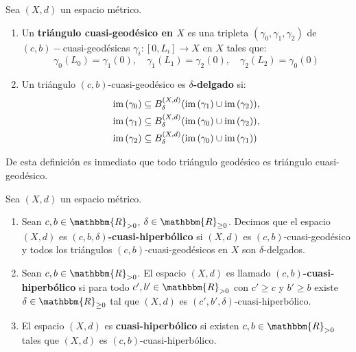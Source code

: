 \documentclass[12pt]{report}
\theoremstyle{largebreak}
\newcommand\cf[3]{\ensuremath{#1:#2\rightarrow#3}}
\newcommand{\bbm}[1]{\ensuremath{\mathbbm{#1}}}
\newcommand{\im}[1]{\ensuremath{\textup{im}\left(#1\right)}}
\begin{document}
    \begin{mydef}
        Sea $(X,d)$ un espacio métrico.
        \begin{enumerate}[label = \textit{\arabic*}]
            \item Un \textbf{triángulo cuasi-geodésico en $X$} es una tripleta $(\gamma_0,\gamma_1,\gamma_2)$ de $(c,b)-$cuasi-geodésicas $\cf{\gamma_i}{[0,L_i]}{X}$ en $X$ tales que:
            \begin{equation*}
                \gamma_0(L_0)=\gamma_1(0),\quad \gamma_1(L_1)=\gamma_2(0),\quad \gamma_2(L_2)=\gamma_0(0)
            \end{equation*}
            \item Un triángulo $(c,b)$-cuasi-geodésico es \textbf{$\delta$-delgado} si:
            \begin{equation*}
                \begin{split}
                    \im{\gamma_0}&\subseteq B_{\delta}^{(X,d)}(\im{\gamma_1}\cup\im{\gamma_2}),\\
                    \im{\gamma_1}&\subseteq B_{\delta}^{(X,d)}(\im{\gamma_0}\cup\im{\gamma_2}),\\
                    \im{\gamma_2}&\subseteq B_{\delta}^{(X,d)}(\im{\gamma_0}\cup\im{\gamma_1})\\
                \end{split}
            \end{equation*}
        \end{enumerate}
    \end{mydef}


    \begin{obs}
        De esta definición es inmediato que todo triángulo geodésico es triángulo cuasi-geodésico.
    \end{obs}

    \begin{mydef}
        Sea $(X,d)$ un espacio métrico.
        \begin{enumerate}[label = \textit{(\arabic*)}]
            \item Sean $c,b\in\bbm{R}_{>0}$, $\delta\in\bbm{R}_{\geq0}$. Decimos que el espacio $(X,d)$ es \textbf{$(c,b,\delta)$-cuasi-hiperbólico} si $(X,d)$ es $(c,b)$-cuasi-geodésico y todos los triángulos $(c,b)$-cuasi-geodésicos en $X$ son $\delta$-delgados.
            \item Sean $c,b\in\bbm{R}_{>0}$. El espacio $(X,d)$ es llamado \textbf{$(c,b)$-cuasi-hiperbólico} si para todo $c',b'\in\bbm{R}_{>0}$ con $c'\geq c$ y $b'\geq b$ existe $\delta\in\bbm{R}_{\geq0}$ tal que $(X,d)$ es $(c',b',\delta)$-cuasi-hiperbólico.
            \item El espacio $(X,d)$ es \textbf{cuasi-hiperbólico} si existen $c,b\in\bbm{R}_{>0}$ tales que $(X,d)$ es $(c,b)$-cuasi-hiperbólico.
        \end{enumerate}
    \end{mydef}
\end{document}
